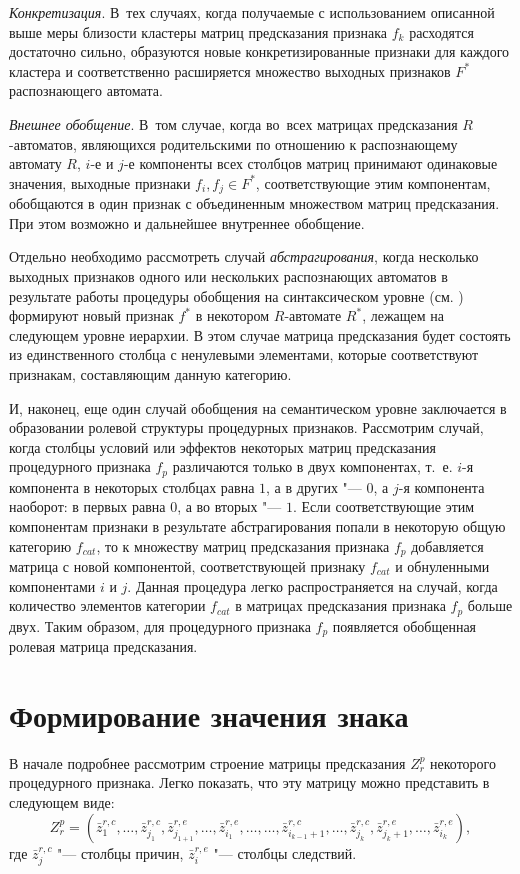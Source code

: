 \documentclass[a4paper, 12pt]{article}
\numberwithin{equation}{section}
\begin{document}
	\textit{Конкретизация}. В~тех случаях, когда получаемые с использованием описанной выше меры близости кластеры матриц предсказания признака $f_k$ расходятся достаточно сильно, образуются новые конкретизированные признаки для каждого кластера и соответственно расширяется множество выходных признаков $F^*$ распознающего автомата.
	
	\textit{Внешнее обобщение}. В~том случае, когда во~всех матрицах предсказания $R$-автоматов, являющихся родительскими по отношению к распознающему автомату $R$, $i$-е и $j$-е компоненты всех столбцов матриц принимают одинаковые значения, выходные признаки $f_i,f_j\in F^*$, соответствующие этим компонентам, обобщаются в один признак с объединенным множеством матриц предсказания. При этом возможно и дальнейшее внутреннее обобщение.
	
	Отдельно необходимо рассмотреть случай \textit{абстрагирования}, когда несколько выходных признаков одного или нескольких распознающих автоматов в результате работы процедуры обобщения на синтаксическом уровне (см. \cite{PanovA2014a}) формируют новый признак $f^*$ в некотором $R$-автомате $R^*$, лежащем на следующем уровне иерархии. В этом случае матрица предсказания будет состоять из единственного столбца с ненулевыми элементами, которые соответствуют признакам, составляющим данную категорию.
	
	И, наконец, еще один случай обобщения на семантическом уровне заключается в образовании ролевой структуры процедурных признаков. Рассмотрим случай, когда столбцы условий или эффектов некоторых матриц предсказания процедурного признака $f_p$ различаются только в двух компонентах, т.~е. $i$-я компонента в некоторых столбцах равна $1$, а в других "--- $0$, а $j$-я компонента наоборот: в первых равна $0$, а во вторых "--- $1$. Если соответствующие этим компонентам признаки в результате абстрагирования попали в некоторую общую категорию $f_{cat}$, то к множеству матриц предсказания признака $f_p$ добавляется матрица с новой компонентой, соответствующей признаку $f_{cat}$ и обнуленными компонентами $i$ и $j$. Данная процедура легко распространяется на случай, когда количество элементов категории $f_{cat}$ в матрицах предсказания признака $f_p$ больше двух. Таким образом, для процедурного признака $f_p$ появляется обобщенная ролевая матрица предсказания.

	\section{Формирование значения знака} \label{sect:link}
	В начале подробнее рассмотрим строение матрицы предсказания $Z_r^p$ некоторого процедурного признака. Легко показать, что эту матрицу можно представить в следующем виде:
	\begin{equation*}
	Z_r^p=(\bar z_1^{r,c},\dots,\bar z_{j_1}^{r,c},\bar z_{j_{1+1}}^{r,e},\dots,\bar z_{i_1}^{r,e},\dots,\dots,\bar z_{i_{k-1}+1}^{r,c},\dots,\bar z_{j_k}^{r,c},\bar z_{j_k+1}^{r,e},\dots,\bar z_{i_k}^{r,e}),
	\end{equation*}
	где $\bar z_j^{r,c}$ "--- столбцы причин, $\bar z_i^{r,e}$ "--- столбцы следствий. 
	
\end{document}
